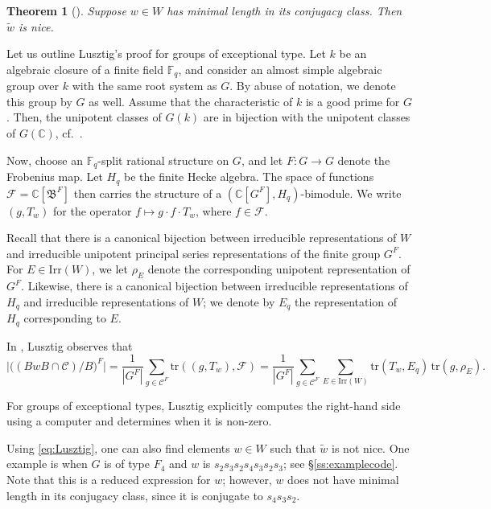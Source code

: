 \documentclass[11pt]{amsart}
\newtheorem{thm}{Theorem}
\theoremstyle{definition}
\newcommand{\bC}{\mathbb{C}}
\newcommand{\fB}{\mathfrak{B}}
\newcommand{\cC}{\mathcal{C}}
\newcommand{\Irr}{\mathrm{Irr}}
\newcommand{\Fq}{\mathbb{F}_q}
\newcommand{\cF}{\mathcal{F}}
\begin{document}
\begin{thm}[\cite{Lusztig}] 
Suppose $w\in W$ has minimal length in its conjugacy class. Then $\widetilde{w}$ is nice.
\end{thm}

Let us outline Lusztig's proof for groups of exceptional type. Let $k$ be an algebraic closure of a finite field $\Fq$, and consider an almost simple algebraic group over $k$ with the same root system as $G$. By abuse of notation, we denote this group by $G$ as well. Assume that the characteristic of $k$ is a good prime for $G$. Then, the unipotent classes of $G(k)$ are in bijection with the unipotent classes of $G(\bC)$, cf.\ \cite{Premet}.

Now, choose an $\Fq$-split rational structure on $G$, and let $F:G\to G$ denote the Frobenius map. Let $H_q$ be the finite Hecke algebra. The space of functions $\cF=\mathbb{C}[\fB^F]$ then carries the structure of a $(\mathbb{C}[G^F],H_q)$-bimodule. We write $(g,T_w)$ for the operator $f\mapsto g\cdot f\cdot T_w$, where $f\in \cF$.

Recall that there is a canonical bijection between irreducible representations of $W$ and irreducible unipotent principal series representations of the finite group $G^F$. For $E\in \Irr(W)$, we let $\rho_E$ denote the corresponding unipotent representation of $G^F$. Likewise, there is a canonical bijection between irreducible representations of $H_q$ and irreducible representations of $W$; we denote by $E_q$ the representation of $H_q$ corresponding to $E$.

In \cite[\S 1.2]{Lusztig}, Lusztig observes that
\begin{equation} \label{eq:Lusztig}
\big|\big((BwB\cap \cC)/B\big)^F\big|
= \frac{1}{|G^F|} \sum_{g\in \cC^F} \mathrm{tr}((g,T_w),\cF)
= \frac{1}{|G^F|} \sum_{g\in \cC^F}\sum_{E\in \mathrm{Irr}(W)}
\mathrm{tr}(T_w,E_q)\,\mathrm{tr}(g,\rho_E).
\end{equation}

For groups of exceptional types, Lusztig explicitly computes the right-hand side using a computer and determines when it is non-zero.


 Using \eqref{eq:Lusztig}, one can also find elements $w\in W$ such that $\widetilde{w}$ is not nice. One example is when $G$ is of type $F_4$ and $w$ is $s_2 s_3 s_2 s_4 s_3 s_2 s_3$; see \S\ref{ss:examplecode}. Note that this is a reduced expression for $w$; however, $w$ does not have minimal length in its conjugacy class, since it is conjugate to $s_4s_3s_2$. 
\end{document}
